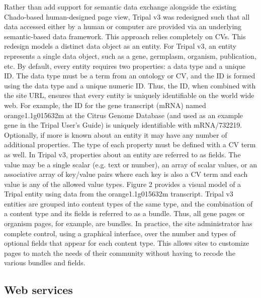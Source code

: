Rather than add support for semantic data exchange alongside the existing Chado-based human-designed page view, Tripal v3 was redesigned such that all data accessed either by a human or computer are provided via an underlying semantic-based data framework. This approach relies completely on CVs. This redesign models a distinct data object as an entity. For Tripal v3, an entity represents a single data object, such as a gene, germplasm, organism, publication, etc. By default, every entity requires two properties: a data type and a unique ID. The data type must be a term from an ontology or CV, and the ID is formed using the data type and a unique numeric ID. Thus, the ID, when combined with the site URL, ensures that every entity is uniquely identifiable on the world wide web. For example, the ID for the gene transcript (mRNA) named orange1.1g015632m at the Citrus Genome Database (and used as an example gene in the Tripal User’s Guide) is uniquely identifiable with mRNA/732219. Optionally, if more is known about an entity it may have any number of additional properties. The type of each property must be defined with a CV term as well. In Tripal v3, properties about an entity are referred to as fields. The value may be a single scalar (e.g. text or number), an array of scalar values, or an associative array of key/value pairs where each key is also a CV term and each value is any of the allowed value types. Figure 2 provides a visual model of a Tripal entity using data from the orange1.1g015632m transcript. Tripal v3 entities are grouped into content types of the same type, and the combination of a content type and its fields is referred to as a bundle. Thus, all gene pages or organism pages, for example, are bundles. In practice, the site administrator has complete control, using a graphical interface, over the number and types of optional fields that appear for each content type. This allows sites to customize pages to match the needs of their community without having to recode the various bundles and fields.


\subsection*{Web services}


